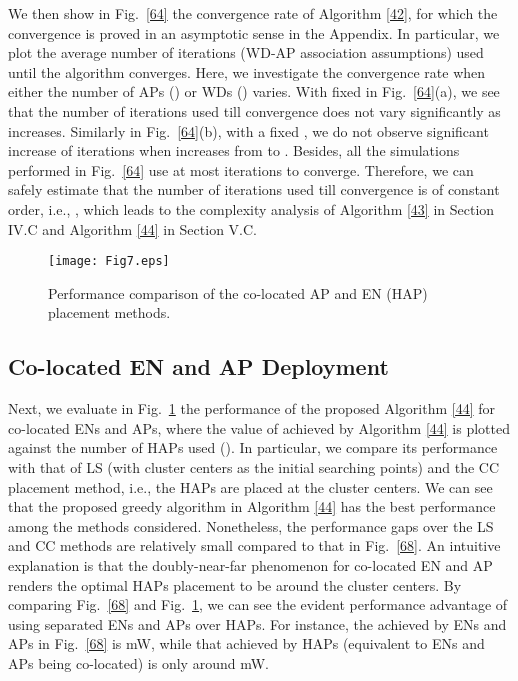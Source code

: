\documentclass[journal, draftcls, one column, 12pt]{IEEEtran}
\begin{document}
We then show in Fig.~\ref{64} the convergence rate of Algorithm \ref{42}, for which the convergence is proved in an asymptotic sense in the Appendix. In particular, we plot the average number of iterations (WD-AP association assumptions) used until the algorithm converges. Here, we investigate the convergence rate when either the number of APs () or WDs () varies. With fixed  in Fig.~\ref{64}(a), we see that the number of iterations used till convergence does not vary significantly as  increases. Similarly in Fig.~\ref{64}(b), with a fixed , we do not observe significant increase of iterations when  increases from  to . Besides, all the simulations performed in Fig.~\ref{64} use at most  iterations to converge. Therefore, we can safely estimate that the number of iterations used till convergence is of constant order, i.e., , which leads to the complexity analysis of Algorithm \ref{43} in Section IV.C and Algorithm \ref{44} in Section V.C.

\begin{figure}
\centering
  \begin{center}
    \texttt{[image: Fig7.eps]}
  \end{center}
  \caption{Performance comparison of the co-located AP and EN (HAP) placement methods.}
  \label{69}
\end{figure}


\subsection{Co-located EN and AP Deployment}
Next, we evaluate in Fig.~\ref{69} the performance of the proposed Algorithm \ref{44} for co-located ENs and APs, where the value of  achieved by Algorithm \ref{44} is plotted against the number of HAPs used (). In particular, we compare its performance with that of LS (with  cluster centers as the initial searching points) and the CC placement method, i.e., the HAPs are placed at the  cluster centers. We can see that the proposed greedy algorithm in Algorithm \ref{44} has the best performance among the methods considered. Nonetheless, the performance gaps over the LS and CC methods are relatively small compared to that in Fig.~\ref{68}. An intuitive explanation is that the doubly-near-far phenomenon for co-located EN and AP renders the optimal HAPs placement to be around the cluster centers. By comparing Fig.~\ref{68} and Fig.~\ref{69}, we can see the evident performance advantage of using separated ENs and APs over HAPs. For instance, the  achieved by  ENs and  APs in Fig.~\ref{68} is mW, while that achieved by  HAPs (equivalent to  ENs and  APs being co-located) is only around mW.
\end{document}
